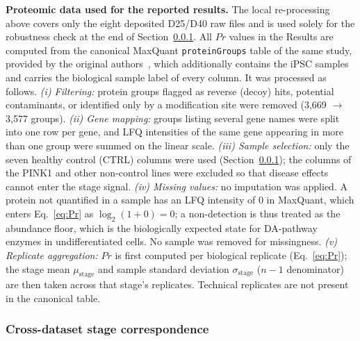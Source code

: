 \documentclass[5p,times,twocolumn]{elsarticle}
\newcommand{\rtag}[1]{}
\newcommand{\rev}[2]{\rtag{#1}#2}
\newenvironment{revblock}[1]{\par\rtag{#1}\ignorespaces}{\par}
\begin{document}
\begin{revblock}{R2.4}
  \textbf{Proteomic data used for the reported results.}
  The local re-processing above covers only the eight
  deposited D25/D40 raw files and is used solely for the
  robustness check at the end of
  Section~\ref{sec:matching}.
  All $Pr$ values in the Results are computed from the
  canonical MaxQuant \texttt{proteinGroups} table of the same
  study, provided by the original
  authors~\cite{novak2022single}, which additionally contains
  the iPSC samples and carries the biological sample label of
  every column.
  It was processed as follows.
  \textit{(i) Filtering:} protein groups flagged as reverse
  (decoy) hits, potential contaminants, or identified only by
  a modification site were removed (3,669 $\to$ 3,577 groups).
  \textit{(ii) Gene mapping:} groups listing several gene
  names were split into one row per gene, and LFQ intensities
  of the same gene appearing in more than one group were
  summed on the linear scale.
  \textit{(iii) Sample selection:} only the seven healthy
  control (CTRL) columns were used
  (Section~\ref{sec:matching}); the columns of the PINK1 and
  other non-control lines were excluded so that disease effects
  cannot enter the stage signal.
  \textit{(iv) Missing values:} no imputation was applied.
  A protein not quantified in a sample has an LFQ intensity of
  0 in MaxQuant, which enters Eq.~\eqref{eq:Pr} as
  $\log_{2}(1+0) = 0$; a non-detection is thus treated as the
  abundance floor, which is the biologically expected state for
  DA-pathway enzymes in undifferentiated cells.
  No sample was removed for missingness.
  \textit{(v) Replicate aggregation:} $Pr$ is first computed
  per biological replicate (Eq.~\eqref{eq:Pr}); the stage mean
  $\mu_{\text{stage}}$ and sample standard deviation
  $\sigma_{\text{stage}}$ ($n-1$ denominator) are then taken
  across that stage's replicates.
  Technical replicates are not present in the canonical table.
\end{revblock}



\subsubsection{\rev{R2.22}{Cross-dataset stage correspondence}}
\label{sec:matching}
\end{document}
